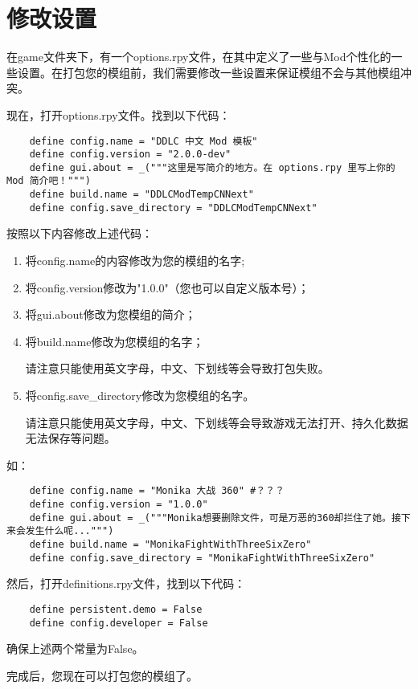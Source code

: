 \documentclass[../../Main.tex]{subfiles}
\begin{document}
\section{修改设置}

在game文件夹下，有一个options.rpy文件，在其中定义了一些与Mod个性化的一些设置。在打包您的模组前，我们需要修改一些设置来保证模组不会与其他模组冲突。

现在，打开options.rpy文件。找到以下代码：
\begin{lstlisting}
    define config.name = "DDLC 中文 Mod 模板"
    define config.version = "2.0.0-dev"
    define gui.about = _("""这里是写简介的地方。在 options.rpy 里写上你的 Mod 简介吧！""")
    define build.name = "DDLCModTempCNNext"
    define config.save_directory = "DDLCModTempCNNext"
\end{lstlisting}

按照以下内容修改上述代码：
\begin{enumerate}
    \item 将config.name的内容修改为您的模组的名字;
    \item 将config.version修改为"1.0.0"（您也可以自定义版本号）；
    \item 将gui.about修改为您模组的简介；
    \item 将build.name修改为您模组的名字；
    \begin{Attention}
        请注意只能使用英文字母，中文、下划线等会导致打包失败。
    \end{Attention}
    \item 将config.save\_directory修改为您模组的名字。
    \begin{Attention}
        请注意只能使用英文字母，中文、下划线等会导致游戏无法打开、持久化数据无法保存等问题。
    \end{Attention}
\end{enumerate}
如：
\begin{lstlisting}
    define config.name = "Monika 大战 360" #？？？
    define config.version = "1.0.0"
    define gui.about = _("""Monika想要删除文件，可是万恶的360却拦住了她。接下来会发生什么呢...""")
    define build.name = "MonikaFightWithThreeSixZero"
    define config.save_directory = "MonikaFightWithThreeSixZero"
\end{lstlisting}

然后，打开definitions.rpy文件，找到以下代码：
\begin{lstlisting}
    define persistent.demo = False
    define config.developer = False
\end{lstlisting}

确保上述两个常量为False。

完成后，您现在可以打包您的模组了。
\end{document}
